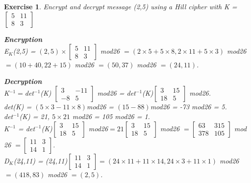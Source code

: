 \documentclass[a4paper, 12pt]{report}
\newtheorem{exercise}{\textbf{Exercise}}
\begin{document}
\begin{exercise}
	Encrypt and decrypt message (2,5) using a Hill cipher with K = $
	\begin{bmatrix}
		5 & 11\\
		8 & 3	
	\end{bmatrix}$
	
	\vspace{5mm}
	\textbf{Encryption}\\
	E$_K$(2,5) = $(2,5) \times 
	\begin{bmatrix}
		5 & 11\\
		8 & 3	
	\end{bmatrix}$ mod26 $= (2\times5+5\times8,2\times11+5\times3)$ mod26 $=(10+40,22+15)$ mod26 $=(50,37)$ mod26 $=(24,11)$.
	
	\vspace{5mm}
	\textbf{Decryption}\\
	K$^{-1} = $det$^{-1}$(K) $\begin{bmatrix}
		3 & -11\\
		-8 & 5	
	\end{bmatrix}$ mod26 = det$^{-1}$(K)$
	\begin{bmatrix}
		3 & 15\\
		18 & 5	
	\end{bmatrix}$ mod26.\\
	det(K) = $(5\times3-11\times8)$mod26 = $(15-88)$mod26 = -73 mod26 = 5.\\
	det$^{-1}$(K) = 21, $5\times21$ mod26 = 105 mod26 = 1.\\
	K$^{-1}$ = det$^{-1}$(K)$
	\begin{bmatrix}
	3 & 15\\
	18 & 5	
	\end{bmatrix}$ mod26$ = 21
	\begin{bmatrix}
	3 & 15\\
	18 & 5	
	\end{bmatrix}$ mod26 $=
	\begin{bmatrix}
	63 & 315\\
	378 & 105	
	\end{bmatrix}$ mod 26 $=
	\begin{bmatrix}
	11 & 3\\
	14 & 1	
	\end{bmatrix}$.\\
	D$_K$(24,11)  = (24,11)$
	\begin{bmatrix}
	11 & 3\\
	14 & 1	
	\end{bmatrix} = (24\times11+11\times14,24\times3+11\times1)$ mod26 $=(418,83)$ mod26 $=(2,5)$.
\end{exercise}
\end{document}
